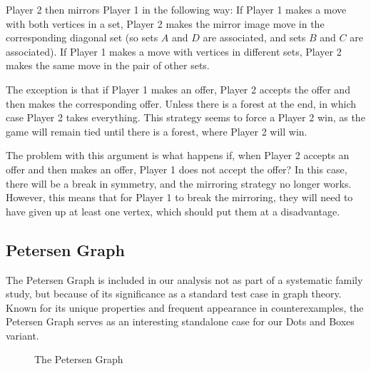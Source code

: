 \documentclass{article}
\begin{document}
Player 2 then mirrors Player 1 in the following way: If Player 1 makes a move with both vertices in a set, Player 2 makes the mirror image move in the corresponding diagonal set (so sets $A$ and $D$ are associated, and sets $B$ and $C$ are associated). If Player 1 makes a move with vertices in different sets, Player 2 makes the same move in the pair of other sets.

The exception is that if Player 1 makes an offer, Player 2 accepts the offer and then makes the corresponding offer. Unless there is a forest at the end, in which case Player 2 takes everything. This strategy seems to force a Player 2 win, as the game will remain tied until there is a forest, where Player 2 will win.

The problem with this argument is what happens if, when Player 2 accepts an offer and then makes an offer, Player 1 does not accept the offer? In this case, there will be a break in symmetry, and the mirroring strategy no longer works. However, this means that for Player 1 to break the mirroring, they will need to have given up at least one vertex, which should put them at a disadvantage.

\subsection{Petersen Graph}

The Petersen Graph is included in our analysis not as part of a systematic family study, but because of its significance as a standard test case in graph theory. Known for its unique properties and frequent appearance in counterexamples, the Petersen Graph serves as an interesting standalone case for our Dots and Boxes variant.

\begin{figure}[hbt!]
\centering
{}
\caption{The Petersen Graph}
\label{fig:petersen-graph}
\end{figure}
\FloatBarrier
\end{document}
